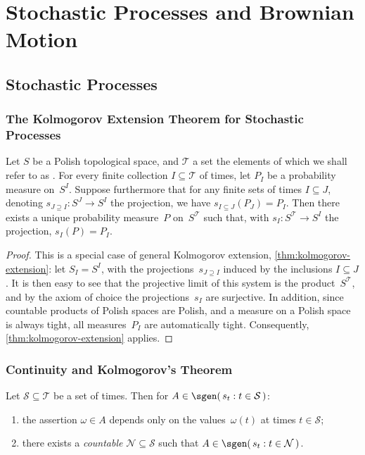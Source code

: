 \chapter	{Stochastic Processes and Brownian Motion}

\section	{Stochastic Processes}

\subsection	{The Kolmogorov Extension Theorem for Stochastic Processes}

\begin	{theorem}
\label	{thm:kolmogorov-extension-for-processes}
Let $S$ be a Polish topological space,
and $\mathcal T$ a set the elements of which we shall refer to as .
For every finite collection \( I \subseteq \mathcal T \) of times,
let \( P_I \) be a probability measure on~$S^I$.
Suppose furthermore that for any finite sets of times \( I \subseteq J \),
denoting \( s_{J \supseteq I} \colon S^J \to S^I \) the projection,
we have \( s_{I \subseteq J}(P_J) = P_I \).
Then there exists a unique probability measure~$P$ on~$S^{\mathcal T}$
such that, with \( s_I \colon S^{\mathcal T} \to S^I \)
the projection, \( s_I(P) = P_I \).
\end	{theorem}
\begin	{proof}
This is a special case of general Kolmogorov extension,
\autoref{thm:kolmogorov-extension}:
let \( S_I = S^I \), with the projections~$s_{J \supseteq I}$
induced by the inclusions \( I \subseteq J \).
It is then easy to see that the projective limit of this system
is the product~$S^{\mathcal T}$,
and by the axiom of choice the projections~$s_I$ are surjective.
In addition, since countable products of Polish spaces are Polish,
and a measure on a Polish space is always tight,
all measures~$P_I$ are automatically tight.
Consequently, \autoref{thm:kolmogorov-extension} applies.
\end	{proof}


\subsection	{Continuity and Kolmogorov's Theorem}

\begin	{proposition}
Let \( \mathcal S \subseteq \mathcal T \) be a set of times.
Then for \( A \in \sgen(\, s_t : t \in \mathcal S \,) \):
\begin	{enumerate}
\item	the assertion \( \omega \in A \) depends only on the values~$\omega(t)$
	at times \( t \in \mathcal S \);
\item	there exists a \emph{countable} \( \mathcal N \subseteq \mathcal S \)
	such that \( A \in \sgen(\, s_t : t \in \mathcal N \,) \).
\end	{enumerate}
\end	{proposition}
